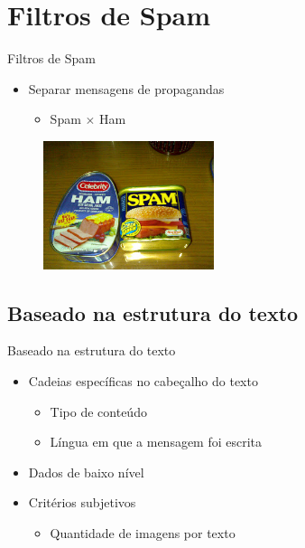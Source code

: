 \documentclass[dvipdfm]{beamer}
\begin{document}
\section{Filtros de Spam}
\begin{frame}{Filtros de Spam}
	\begin{itemize}
		\item Separar mensagens de propagandas
		\begin{itemize}
			\item Spam $\times$ Ham
		\end{itemize}
	\end{itemize}
	\begin{figure}[h]
		\centering
		\includegraphics[width=5cm]{Imagens/spam/spamvsham.jpg}
	\end{figure}
\end{frame}

\subsection{Baseado na estrutura do texto} 
\begin{frame}{Baseado na estrutura do texto}
	\begin{itemize}
		\item Cadeias específicas no cabeçalho do texto
		\begin{itemize}
			\item Tipo de conteúdo
			\item	Língua em que a mensagem foi escrita
		\end{itemize}
		\item Dados de baixo nível
		\item Critérios subjetivos
		\begin{itemize}
			\item Quantidade de imagens por texto
		\end{itemize}
	\end{itemize}
\end{frame}
\end{document}

